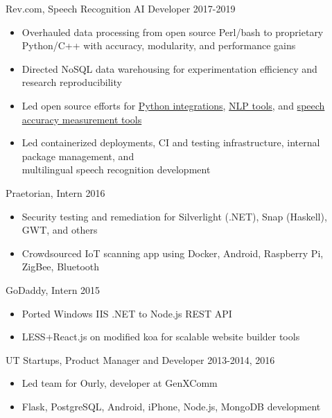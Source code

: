 \documentclass[line,margin]{res}
\begin{document}
\begin{resume}
    Rev.com, Speech Recognition AI Developer
    \hfill  2017-2019
        \begin{itemize} \itemsep -2pt
        \item Overhauled data processing from open source Perl/bash to proprietary Python/C++ with accuracy, modularity, and performance gains
        \item Directed NoSQL data warehousing for experimentation efficiency and research reproducibility
        \item Led open source efforts for \href{https://github.com/revdotcom/revai-python-sdk}{Python integrations}, \href{https://github.com/revdotcom/words2num}{NLP tools}, and \href{https://github.com/revdotcom/fstalign}{speech accuracy measurement tools}
        \item Led containerized deployments, CI and testing infrastructure, internal package management, and\\ multilingual speech recognition development
        \end{itemize}

    \vspace{-8pt}
    Praetorian, Intern
    \hfill  2016
        \begin{itemize} \itemsep -2pt
        \item Security testing and remediation for Silverlight (.NET), Snap (Haskell), GWT, and others
        \item Crowdsourced IoT scanning app using 
            Docker, Android, Raspberry Pi, ZigBee, Bluetooth
        \end{itemize}

    \vspace{-8pt}
    GoDaddy, Intern
    \hfill  2015
        \begin{itemize} \itemsep -2pt
        \item Ported Windows IIS .NET to Node.js REST API
        \item LESS+React.js on modified koa for scalable website builder tools
        \end{itemize}

    \vspace{-8pt}
    UT Startups, Product Manager and Developer
    \hfill  2013-2014, 2016
        \begin{itemize} \itemsep -2pt
        \item Led team for Ourly, developer at GenXComm
        \item Flask, PostgreSQL, Android, iPhone, Node.js, MongoDB development
        \end{itemize}


\end{resume}
\end{document}
